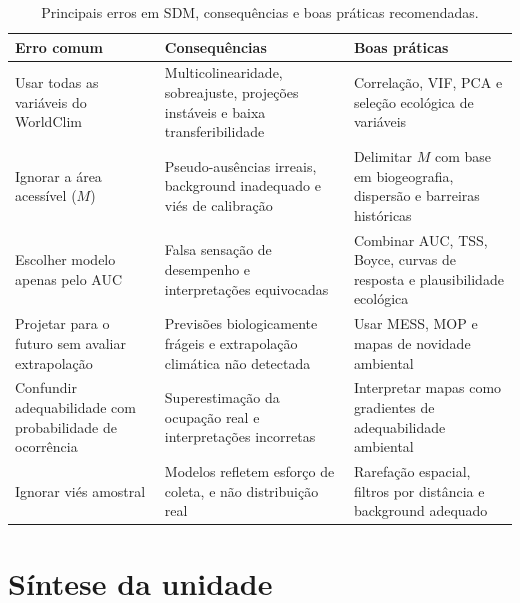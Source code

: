 \documentclass{ueap-sdm}
\begin{document}
\begin{table}[H]
	\centering
	\caption{Principais erros em SDM, consequências e boas práticas recomendadas.}
	\label{tab:erros_comuns_sdm}
	
	\scriptsize
	
	\begin{tabular}{
			p{}
			p{}
			p{}
		}
		
		\toprule
		\textbf{Erro comum} &
		\textbf{Consequências} &
		\textbf{Boas práticas} \\
		\midrule
		
		Usar todas as variáveis do WorldClim &
		Multicolinearidade, sobreajuste, projeções instáveis e baixa transferibilidade &
		Correlação, VIF, PCA e seleção ecológica de variáveis \\
		
		Ignorar a área acessível ($M$) &
		Pseudo-ausências irreais, background inadequado e viés de calibração &
		Delimitar $M$ com base em biogeografia, dispersão e barreiras históricas \\
		
		Escolher modelo apenas pelo AUC &
		Falsa sensação de desempenho e interpretações equivocadas &
		Combinar AUC, TSS, Boyce, curvas de resposta e plausibilidade ecológica \\
		
		Projetar para o futuro sem avaliar extrapolação &
		Previsões biologicamente frágeis e extrapolação climática não detectada &
		Usar MESS, MOP e mapas de novidade ambiental \\
		
		Confundir adequabilidade com probabilidade de ocorrência &
		Superestimação da ocupação real e interpretações incorretas &
		Interpretar mapas como gradientes de adequabilidade ambiental \\
		
		Ignorar viés amostral &
		Modelos refletem esforço de coleta, e não distribuição real &
		Rarefação espacial, filtros por distância e background adequado \\
		
		\bottomrule
	\end{tabular}
	
\end{table}

\section{Síntese da unidade}
\end{document}
